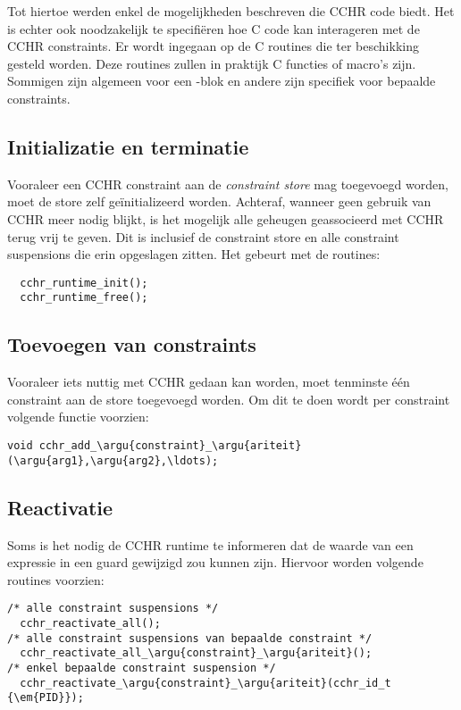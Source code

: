 Tot hiertoe werden enkel de mogelijkheden beschreven die CCHR code biedt. Het is echter ook noodzakelijk te specifi\"eren hoe C code kan interageren met de CCHR constraints. Er wordt ingegaan op de C routines die ter beschikking gesteld worden. Deze routines zullen in praktijk C functies of macro's zijn. Sommigen zijn algemeen voor een -blok en andere zijn specifiek voor bepaalde constraints.

\subsection{Initializatie en terminatie}

Vooraleer een CCHR constraint aan de {\em constraint store} mag toegevoegd worden, moet de store zelf ge\"initializeerd worden. Achteraf, wanneer geen gebruik van CCHR meer nodig blijkt, is het mogelijk alle geheugen geassocieerd met CCHR terug vrij te geven. Dit is inclusief de constraint store en alle constraint suspensions die erin opgeslagen zitten. Het gebeurt met de routines:
\begin{Verbatim}
  cchr_runtime_init();
  cchr_runtime_free();
\end{Verbatim}

\subsection{Toevoegen van constraints}

Vooraleer iets nuttig met CCHR gedaan kan worden, moet tenminste \'e\'en constraint aan de store toegevoegd worden. Om dit te doen wordt per constraint volgende functie voorzien: \begin{Verbatim}[commandchars=\\\{\}]
  void cchr_add_\argu{constraint}_\argu{ariteit}(\argu{arg1},\argu{arg2},\ldots);
\end{Verbatim}

\subsection{Reactivatie} \label{sec:crout-reactiv}

Soms is het nodig de CCHR runtime te informeren dat de waarde van een expressie in een guard gewijzigd zou kunnen zijn. Hiervoor worden volgende routines voorzien: \begin{Verbatim}[commandchars=\\\{\}]
/* alle constraint suspensions */
  cchr_reactivate_all(); 
/* alle constraint suspensions van bepaalde constraint */
  cchr_reactivate_all_\argu{constraint}_\argu{ariteit}();
/* enkel bepaalde constraint suspension */
  cchr_reactivate_\argu{constraint}_\argu{ariteit}(cchr_id_t {\em{PID}});
\end{Verbatim}

